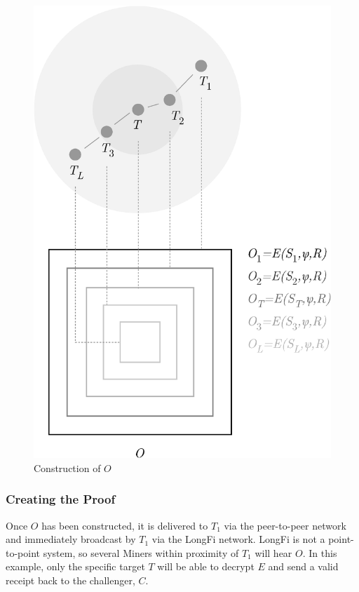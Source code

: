 \documentclass[10pt, nonatbib, nocopyrightspace, reprint]{sigplanconf}
\begin{document}
\begin{figure}[ht]
    \begin{center}
          \includegraphics[width=\columnwidth]{o_construction.eps}
          \caption{Construction of $O$}\label{fig:poc-o_construction}
     \end{center}
\end{figure}

\subsubsection{Creating the Proof}

Once $O$ has been constructed, it is delivered to $T_1$ via the peer-to-peer network and immediately broadcast by $T_1$ via the LongFi network. LongFi is not a point-to-point system, so several Miners within proximity of $T_1$ will hear $O$. In this example, only the specific target $T$ will be able to decrypt $E$ and send a valid receipt back to the challenger, $C$.
\end{document}
